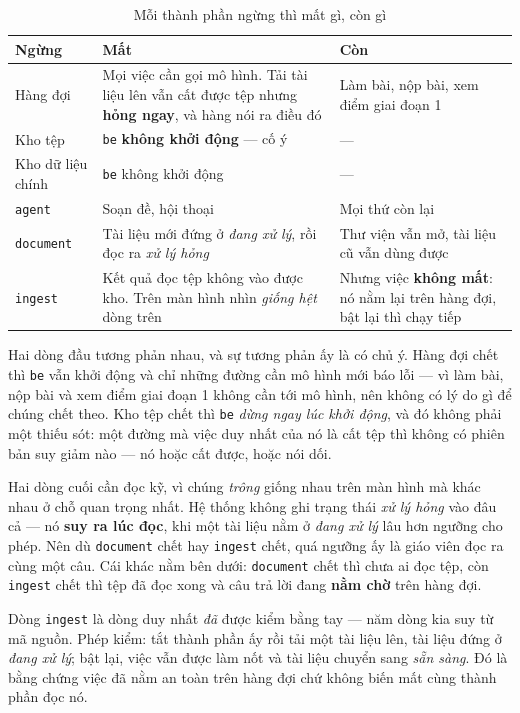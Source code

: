 \begin{table}[htbp]
\centering
\caption{Mỗi thành phần ngừng thì mất gì, còn gì}
\label{tab:suy-giam}
\begin{tabular}{@{}lL{5.0cm}L{5.6cm}@{}}
\toprule
\textbf{Ngừng} & \textbf{Mất} & \textbf{Còn} \\
\midrule
Hàng đợi & Mọi việc cần gọi mô hình. Tải tài liệu lên vẫn cất được tệp nhưng \textbf{hỏng ngay}, và hàng nói ra điều đó & Làm bài, nộp bài, xem điểm giai đoạn 1 \\
\addlinespace
Kho tệp & \texttt{be} \textbf{không khởi động} --- cố ý & --- \\
\addlinespace
Kho dữ liệu chính & \texttt{be} không khởi động & --- \\
\addlinespace
\texttt{agent} & Soạn đề, hội thoại & Mọi thứ còn lại \\
\addlinespace
\texttt{document} & Tài liệu mới đứng ở \emph{đang xử lý}, rồi đọc ra \emph{xử lý hỏng} & Thư viện vẫn mở, tài liệu cũ vẫn dùng được \\
\addlinespace
\texttt{ingest} & Kết quả đọc tệp không vào được kho. Trên màn hình nhìn \emph{giống hệt} dòng trên & Nhưng việc \textbf{không mất}: nó nằm lại trên hàng đợi, bật lại thì chạy tiếp \\
\bottomrule
\end{tabular}
\end{table}

Hai dòng đầu tương phản nhau, và sự tương phản ấy là có chủ ý. Hàng đợi chết thì \texttt{be} vẫn
khởi động và chỉ những đường cần mô hình mới báo lỗi --- vì làm bài, nộp bài và xem điểm giai
đoạn 1 không cần tới mô hình, nên không có lý do gì để chúng chết theo. Kho tệp chết thì
\texttt{be} \emph{dừng ngay lúc khởi động}, và đó không phải một thiếu sót: một đường mà việc duy
nhất của nó là cất tệp thì không có phiên bản suy giảm nào --- nó hoặc cất được, hoặc nói dối.

Hai dòng cuối cần đọc kỹ, vì chúng \emph{trông} giống nhau trên màn hình mà khác nhau ở chỗ
quan trọng nhất. Hệ thống không ghi trạng thái \emph{xử lý hỏng} vào đâu cả --- nó \textbf{suy
ra lúc đọc}, khi một tài liệu nằm ở \emph{đang xử lý} lâu hơn ngưỡng cho phép. Nên dù
\texttt{document} chết hay \texttt{ingest} chết, quá ngưỡng ấy là giáo viên đọc ra cùng một
câu. Cái khác nằm bên dưới: \texttt{document} chết thì chưa ai đọc tệp, còn \texttt{ingest}
chết thì tệp đã đọc xong và câu trả lời đang \textbf{nằm chờ} trên hàng đợi.

Dòng \texttt{ingest} là dòng duy nhất \emph{đã} được kiểm bằng tay --- năm dòng kia suy từ mã
nguồn. Phép kiểm: tắt thành phần ấy rồi tải một tài liệu lên, tài liệu đứng ở \emph{đang xử lý};
bật lại, việc vẫn được làm nốt và tài liệu chuyển sang \emph{sẵn sàng}. Đó là bằng chứng việc đã
nằm an toàn trên hàng đợi chứ không biến mất cùng thành phần đọc nó.

